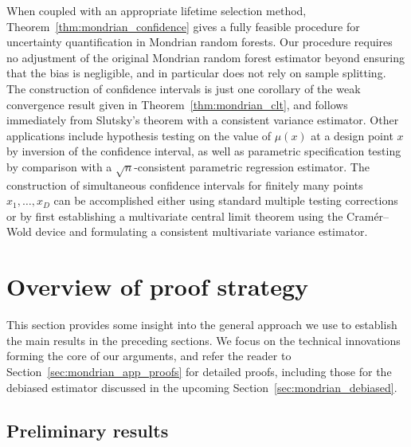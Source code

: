 \documentclass[11pt,lof]{puthesis}
\theoremstyle{break}
\theoremstyle{proof}
\begin{document}
When coupled with an appropriate lifetime selection method,
Theorem~\ref{thm:mondrian_confidence} gives a fully feasible procedure for
uncertainty
quantification in Mondrian random forests. Our procedure requires no adjustment
of the original Mondrian random forest estimator beyond ensuring that the bias
is negligible, and in particular does not rely on sample splitting. The
construction of confidence intervals is just one corollary of the weak
convergence result given in Theorem~\ref{thm:mondrian_clt}, and follows
immediately from Slutsky's theorem
\citep[Chapter~7]{pollard2002user}
with a consistent variance estimator. Other applications
include hypothesis testing on the value of $\mu(x)$ at a design point $x$ by
inversion of the confidence interval, as well as parametric specification
testing by comparison with a $\sqrt{n}$-consistent parametric regression
estimator. The construction of simultaneous confidence intervals for finitely
many points $x_1, \ldots, x_D$ can be accomplished either using standard
multiple testing corrections or by first establishing a multivariate central
limit theorem using the Cram{\'e}r--Wold device
\citep[Chapter~8]{pollard2002user}
and formulating a consistent multivariate variance estimator.

\section{Overview of proof strategy}%
\label{sec:mondrian_overview_proofs}

This section provides some insight into the general approach we use to
establish the main results in the preceding sections. We focus on the technical
innovations forming the core of our arguments, and refer the reader to
Section~\ref{sec:mondrian_app_proofs} for detailed proofs, including those for
the
debiased estimator discussed in the upcoming
Section~\ref{sec:mondrian_debiased}.

\subsection*{Preliminary results}
\end{document}
